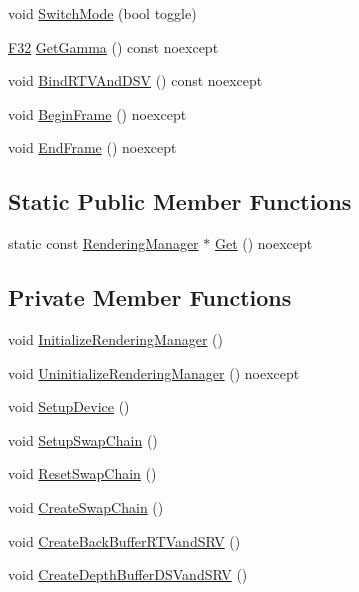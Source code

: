 \begin{DoxyCompactItemize}
void \hyperlink{classmage_1_1_rendering_manager_aae67558bce110b0fba0a3ccdfeb64431}{Switch\+Mode} (bool toggle)
\item 
\hyperlink{namespacemage_aa97e833b45f06d60a0a9c4fc22ae02c0}{F32} \hyperlink{classmage_1_1_rendering_manager_ad8608d1bf10ef4cf92bbdea4c2d8c1a3}{Get\+Gamma} () const noexcept
\item 
void \hyperlink{classmage_1_1_rendering_manager_aeb6a79f1629a89c66732de9a5952df00}{Bind\+R\+T\+V\+And\+D\+SV} () const noexcept
\item 
void \hyperlink{classmage_1_1_rendering_manager_a740120ccc38cd9a4b2e7f72ad97ef898}{Begin\+Frame} () noexcept
\item 
void \hyperlink{classmage_1_1_rendering_manager_a8ff0d99310ead5217f7516d61871430a}{End\+Frame} () noexcept
\end{DoxyCompactItemize}
\subsection*{Static Public Member Functions}
\begin{DoxyCompactItemize}
\item 
static const \hyperlink{classmage_1_1_rendering_manager}{Rendering\+Manager} $\ast$ \hyperlink{classmage_1_1_rendering_manager_a920fdd741d160b687ecac1d892f8bfd1}{Get} () noexcept
\end{DoxyCompactItemize}
\subsection*{Private Member Functions}
\begin{DoxyCompactItemize}
\item 
void \hyperlink{classmage_1_1_rendering_manager_a7ce05cf44393fbd62d7269440f6d1503}{Initialize\+Rendering\+Manager} ()
\item 
void \hyperlink{classmage_1_1_rendering_manager_a843980fc7b11d9f72bd89198b60d9473}{Uninitialize\+Rendering\+Manager} () noexcept
\item 
void \hyperlink{classmage_1_1_rendering_manager_a45d4cadcd572290f352027b5fa86b4f6}{Setup\+Device} ()
\item 
void \hyperlink{classmage_1_1_rendering_manager_a53cef2fcaff8947f4aa93eb87e247362}{Setup\+Swap\+Chain} ()
\item 
void \hyperlink{classmage_1_1_rendering_manager_a61c6166ea8a5cd7646d1bd91b182cb7d}{Reset\+Swap\+Chain} ()
\item 
void \hyperlink{classmage_1_1_rendering_manager_a879f65b1c2b283edd2ad89606e174a02}{Create\+Swap\+Chain} ()
\item 
void \hyperlink{classmage_1_1_rendering_manager_aced72163a47f3a7faf287b1e6ff8bd3b}{Create\+Back\+Buffer\+R\+T\+Vand\+S\+RV} ()
\item 
void \hyperlink{classmage_1_1_rendering_manager_af7266933031efaef98d96dace200220d}{Create\+Depth\+Buffer\+D\+S\+Vand\+S\+RV} ()
\end{DoxyCompactItemize}
